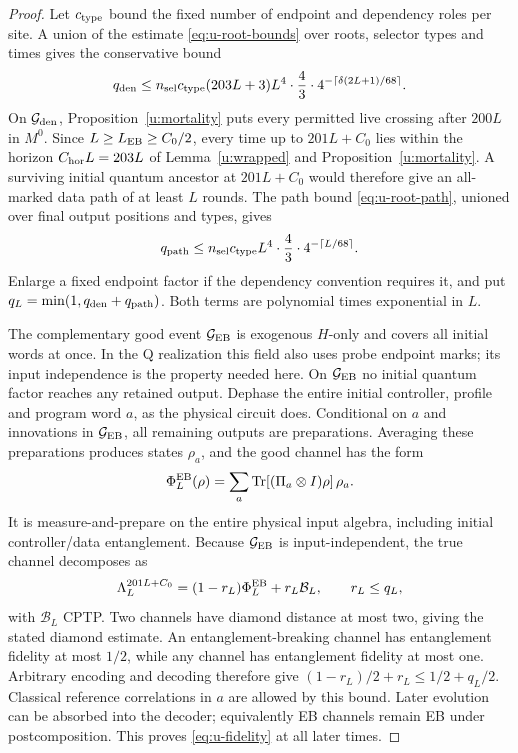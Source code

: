 \begin{proof}
Let \(c_{\rm type}\) bound the fixed number of endpoint and dependency roles per site.
A union of the estimate \eqref{eq:u-root-bounds} over roots,
selector types and times gives the conservative bound
\[
 q_{\rm den}\le n_{\rm sel} c_{\rm type}(203L+3)L^4\cdot\frac43\cdot
                  4^{-\lceil\delta(2L+1)/68\rceil}.
\]
On \(\mathcal G_{\rm den}\), Proposition~\ref{u:mortality} puts every
permitted live crossing after \(200L\) in \(M^0\). Since
\(L\ge L_{\rm EB}\ge C_0/2\), every time up to \(201L+C_0\) lies within
the horizon \(C_{\rm hor}L=203L\) of Lemma~\ref{u:wrapped} and
Proposition~\ref{u:mortality}. A surviving
initial quantum ancestor at \(201L+C_0\) would therefore give an
all-marked data path of at least \(L\) rounds. The path bound \eqref{eq:u-root-path}, unioned over final output positions and types, gives
\[
 q_{\rm path}\le n_{\rm sel} c_{\rm type}L^4\cdot\frac43\cdot
                                      4^{-\lceil L/68\rceil}.
\]
Enlarge a fixed endpoint factor if the dependency convention requires
it, and put \mbox{\(q_L=\min(1,q_{\rm den}+q_{\rm path})\)}.
Both terms are polynomial times exponential in \(L\).

The complementary good event \(\mathcal G_{\rm EB}\) is exogenous \(H\)-only and covers all
initial words at once. In the Q realization this field
also uses probe endpoint marks; its input independence is the property
needed here. On \(\mathcal G_{\rm EB}\) no initial quantum factor reaches any
retained output. Dephase the entire initial controller, profile and program word \(a\), as the
physical circuit does. Conditional on \(a\) and innovations in \(\mathcal G_{\rm EB}\),
all remaining outputs are preparations. Averaging these preparations
produces states \(\rho_a\), and the good channel has the form
\[
 \Phi^{\rm EB}_L(\rho)=
    \sum_a\operatorname{Tr}[(\Pi_a\otimes I)\rho]\,\rho_a.
\]
It is measure-and-prepare on the entire physical input algebra,
including initial controller/data entanglement. Because \(\mathcal G_{\rm EB}\) is
input-independent, the true channel decomposes as
\[
 \Lambda_L^{201L+C_0}=(1-r_L)\Phi^{\rm EB}_L+r_L\mathcal B_L,
 \qquad r_L\le q_L,
\]
with \(\mathcal B_L\) CPTP. Two channels have diamond distance at
most two, giving the stated diamond estimate. An entanglement-breaking
channel has entanglement fidelity at most \(1/2\), while any channel has
entanglement fidelity at most one. Arbitrary encoding and decoding therefore give
\((1-r_L)/2+r_L\le1/2+q_L/2\). Classical reference correlations in
\(a\) are allowed by this bound. Later evolution can be absorbed into
the decoder; equivalently EB channels remain EB under postcomposition.
This proves \eqref{eq:u-fidelity} at all later times.
\end{proof}
